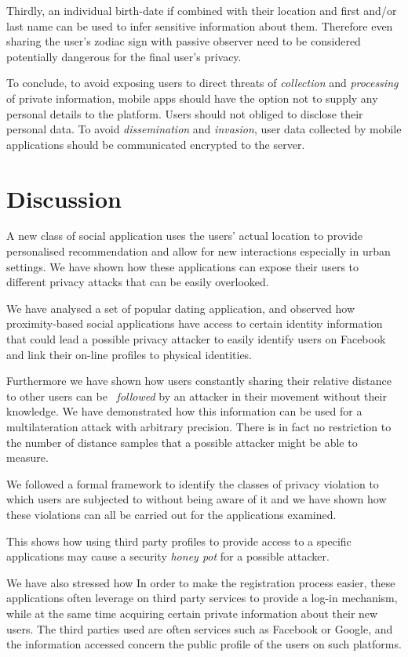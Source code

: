 Thirdly, an individual birth-date if combined with their location and first and/or last name can be used to infer sensitive information about them. Therefore even sharing the user's zodiac sign with passive observer need to be considered potentially dangerous for the final user's privacy.

To conclude, to avoid exposing users to direct threats of \emph{collection} and \emph{processing} of private information, mobile apps should have the option not to supply any personal details to the platform. Users should not obliged to disclose their personal data. To avoid \emph{dissemination} and \emph{invasion}, user data collected by mobile applications should be communicated encrypted to the server.

\section{Discussion}

A new class of social application uses the users' actual location to provide personalised recommendation and allow for new interactions especially in urban settings. We have shown how these applications can expose their users to different privacy attacks that can be easily overlooked.

We have analysed a set of  popular dating application, and observed how proximity-based social applications have access to certain identity information that could lead a possible privacy attacker to easily identify users on Facebook and link their on-line profiles to physical identities.

Furthermore we have shown how users constantly sharing their relative distance to other users can be ~\emph{followed} by an attacker in their movement without their knowledge. We have demonstrated how this information can be used for a multilateration attack with arbitrary precision. There is in fact no restriction to the number of distance samples that a possible attacker might be able to measure.

We followed a formal framework to identify the classes of privacy violation to which users are subjected to without being aware of it and we have shown how these violations can all be carried out for the applications examined.

This shows how using third party profiles to provide access to a specific applications may cause a security \emph{honey pot} for a possible attacker.

We have also stressed how In order to make the registration process easier, these applications often leverage on third party services to provide a log-in mechanism, while at the same time acquiring certain private information about their new users. The third parties used are often services such as Facebook or Google, and the information accessed concern the public profile of the users on such platforms.


